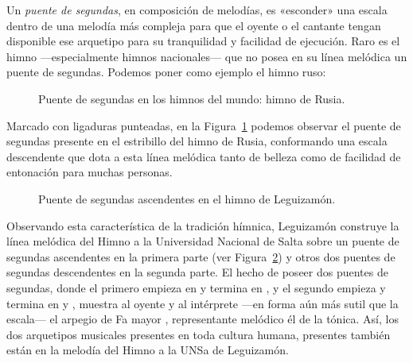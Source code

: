 \label{par:puente}Un \emph{puente de segundas}, en composición de melodías, es «esconder» una escala dentro de una melodía más compleja para que el oyente o el cantante tengan disponible ese arquetipo para su tranquilidad y facilidad de ejecución. Raro es el himno ---especialmente himnos nacionales--- que no posea en su línea melódica un puente de segundas. Podemos poner como ejemplo el himno ruso:

\begin{figure}[H]
\caption{Puente de segundas en los himnos del mundo: himno de Rusia.}
\label{fig:himno-ruso}
\end{figure}

Marcado con ligaduras punteadas, en la Figura~\ref{fig:himno-ruso} podemos observar el puente de segundas presente en el estribillo del himno de Rusia, conformando una escala descendente  que dota a esta línea melódica tanto de belleza como de facilidad de entonación para muchas personas.

\begin{figure}[H]
\caption{Puente de segundas ascendentes en el himno de Leguizamón.}
\label{fig:segundas-ascendentes-himno}
\end{figure}

Observando esta característica de la tradición hímnica, Leguizamón construye la línea melódica del Himno a la Universidad Nacional de Salta sobre un puente de segundas ascendentes  en la primera parte (ver Figura~\ref{fig:segundas-ascendentes-himno}) y otros dos puentes de segundas descendentes  en la segunda parte. El hecho de poseer dos puentes de segundas, donde el primero empieza en  y termina en , y el segundo empieza y termina en  y , muestra al oyente y al intérprete ---en forma aún más sutil que la escala--- el arpegio de Fa mayor \hbox{,} representante melódico él de la tónica. Así, los dos arquetipos musicales presentes en toda cultura humana, presentes también están en la melodía del Himno a la UNSa de Leguizamón.

